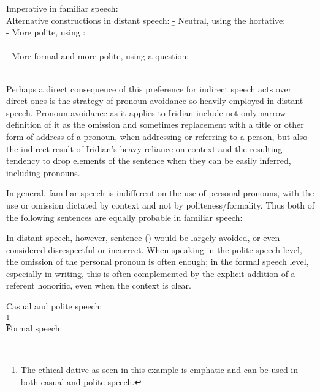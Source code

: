 \pex
\a Imperative in familiar speech:\\
 
\a Alternative constructions in distant speech:
\beginsubsub
  \b{-} {Neutral, using the hortative:\\
  	 }
  \b{-} {More polite, using :\\
  	\\} \b{-} {More formal and more polite, using a
  		question:\\
  	\\
  	}
\endsubsub
\xe

Perhaps a direct consequence of this preference for indirect speech acts over
direct ones is the strategy of {\sc pronoun avoidance} so heavily employed in
distant speech. Pronoun avoidance as it applies to Iridian include not only
 narrow definition of it as the omission and
sometimes replacement with a title or other form of address of a pronoun, when
addressing or referring to a person, but also the indirect result of Iridian's
heavy reliance on context and the resulting tendency to drop elements of the
sentence when they can be easily inferred, including pronouns.

In general, familiar speech is indifferent on the use of personal pronouns, with
the use or omission dictated by context and not by politeness/formality. Thus
both of the following sentences are equally probable in familiar speech:

\pex\a {} 
	\a {} 
\xe

In distant speech, however, sentence () would
be largely avoided, or even considered disrespectful or incorrect. When speaking
in the polite speech level, the omission of the personal pronoun is often
enough; in the formal speech level, especially in writing, this is often
complemented by the explicit addition of a referent honorific, even when the
context is clear.

\pex
	\a Casual and polite speech:\\
		\footnote{ The ethical dative
			as seen in this example is emphatic and can be used in both casual
			and polite speech. }\\
	\a Formal speech:\\
		\\
\xe

